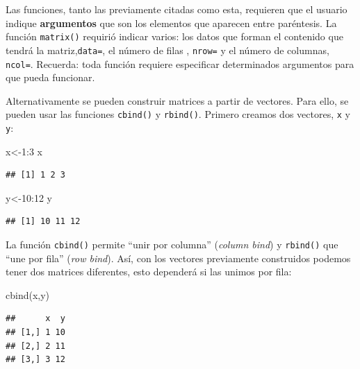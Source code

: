 \documentclass[
  11pt,
  oneside]{book}
\newenvironment{Shaded}{\begin{snugshade}}{\end{snugshade}}
\newcommand{\DecValTok}[1]{\textcolor[rgb]{0.00,0.00,0.81}{#1}}
\newcommand{\FunctionTok}[1]{\textcolor[rgb]{0.00,0.00,0.00}{#1}}
\newcommand{\NormalTok}[1]{#1}
\newcommand{\OtherTok}[1]{\textcolor[rgb]{0.56,0.35,0.01}{#1}}
\newcommand{\SpecialCharTok}[1]{\textcolor[rgb]{0.00,0.00,0.00}{#1}}
\begin{document}
Las funciones, tanto las previamente citadas como esta, requieren que el usuario indique \textbf{argumentos} que son los elementos que aparecen entre paréntesis. La función \texttt{matrix()} requirió indicar varios: los datos que forman el contenido que tendrá la matriz,\texttt{data=}, el número de filas , \texttt{nrow=} y el número de columnas, \texttt{ncol=}. Recuerda: toda función requiere especificar determinados argumentos para que pueda funcionar.

Alternativamente se pueden construir matrices a partir de vectores. Para ello, se pueden usar las funciones \texttt{cbind()} y \texttt{rbind()}. Primero creamos dos vectores, \texttt{x} y \texttt{y}:

\begin{Shaded}
\begin{Highlighting}[]
\NormalTok{x}\OtherTok{\textless{}{-}}\DecValTok{1}\SpecialCharTok{:}\DecValTok{3}
\NormalTok{x}
\end{Highlighting}
\end{Shaded}

\begin{verbatim}
## [1] 1 2 3
\end{verbatim}

\begin{Shaded}
\begin{Highlighting}[]
\NormalTok{y}\OtherTok{\textless{}{-}}\DecValTok{10}\SpecialCharTok{:}\DecValTok{12}
\NormalTok{y}
\end{Highlighting}
\end{Shaded}

\begin{verbatim}
## [1] 10 11 12
\end{verbatim}

La función \texttt{cbind()} permite ``unir por columna'' (\emph{column bind}) y \texttt{rbind()} que ``une por fila'' (\emph{row bind}). Así, con los vectores previamente construidos podemos tener dos matrices diferentes, esto dependerá si las unimos por fila:

\begin{Shaded}
\begin{Highlighting}[]
\FunctionTok{cbind}\NormalTok{(x,y)}
\end{Highlighting}
\end{Shaded}

\begin{verbatim}
##      x  y
## [1,] 1 10
## [2,] 2 11
## [3,] 3 12
\end{verbatim}
\end{document}
